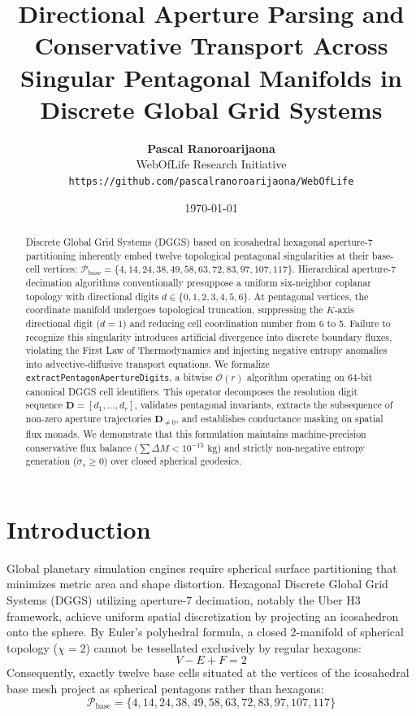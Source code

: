 \documentclass[10pt,twocolumn,a4paper]{article}
\title{\textbf{Directional Aperture Parsing and Conservative Transport Across Singular Pentagonal Manifolds in Discrete Global Grid Systems}}
\author{
  \textbf{Pascal Ranoroarijaona} \\
  WebOfLife Research Initiative \\
  \texttt{https://github.com/pascalranoroarijaona/WebOfLife}
}
\date{\today}
\theoremstyle{definition}
\begin{document}
\maketitle

\begin{abstract}
Discrete Global Grid Systems (DGGS) based on icosahedral hexagonal aperture-7 partitioning inherently embed twelve topological pentagonal singularities at their base-cell vertices:
$\mathcal{P}_{\text{base}} = \{4, 14, 24, 38, 49, 58, 63, 72, 83, 97, 107, 117\}$.
Hierarchical aperture-7 decimation algorithms conventionally presuppose a uniform six-neighbor coplanar topology with directional digits $d \in \{0, 1, 2, 3, 4, 5, 6\}$. At pentagonal vertices, the coordinate manifold undergoes topological truncation, suppressing the $K$-axis directional digit ($d=1$) and reducing cell coordination number from 6 to 5. Failure to recognize this singularity introduces artificial divergence into discrete boundary fluxes, violating the First Law of Thermodynamics and injecting negative entropy anomalies into advective-diffusive transport equations. We formalize \texttt{extractPentagonApertureDigits}, a bitwise $\mathcal{O}(r)$ algorithm operating on 64-bit canonical DGGS cell identifiers. This operator decomposes the resolution digit sequence $\mathbf{D} = [d_1, \dots, d_r]$, validates pentagonal invariants, extracts the subsequence of non-zero aperture trajectories $\mathbf{D}_{\neq 0}$, and establishes conductance masking on spatial flux monads. We demonstrate that this formulation maintains machine-precision conservative flux balance ($\sum \Delta M < 10^{-15}\text{ kg}$) and strictly non-negative entropy generation ($\dot{\sigma}_s \ge 0$) over closed spherical geodesics.
\end{abstract}

\section{Introduction}
Global planetary simulation engines require spherical surface partitioning that minimizes metric area and shape distortion. Hexagonal Discrete Global Grid Systems (DGGS) utilizing aperture-7 decimation, notably the Uber H3 framework, achieve uniform spatial discretization by projecting an icosahedron onto the sphere. By Euler's polyhedral formula, a closed 2-manifold of spherical topology ($\chi = 2$) cannot be tessellated exclusively by regular hexagons:
\begin{equation}
V - E + F = 2
\end{equation}
Consequently, exactly twelve base cells situated at the vertices of the icosahedral base mesh project as spherical pentagons rather than hexagons:
\begin{equation}
\mathcal{P}_{\text{base}} = \{4, 14, 24, 38, 49, 58, 63, 72, 83, 97, 107, 117\}
\end{equation}
\end{document}
